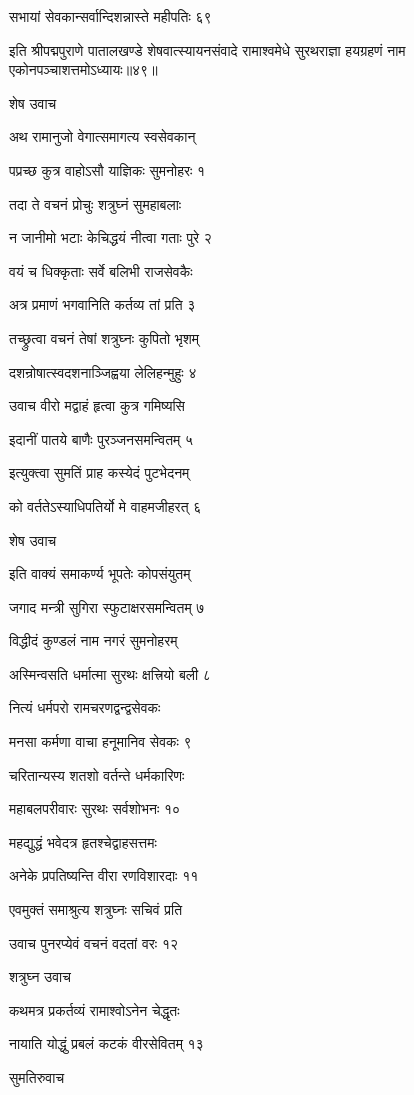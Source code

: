 सभायां सेवकान्सर्वान्दिशन्नास्ते महीपतिः ६९

इति श्रीपद्मपुराणे पातालखण्डे शेषवात्स्यायनसंवादे रामाश्वमेधे सुरथराज्ञा हयग्रहणं नाम एकोनपञ्चाशत्तमोऽध्यायः॥४९॥


शेष उवाच

अथ रामानुजो वेगात्समागत्य स्वसेवकान्

पप्रच्छ कुत्र वाहोऽसौ याज्ञिकः सुमनोहरः १

तदा ते वचनं प्रोचुः शत्रुघ्नं सुमहाबलाः

न जानीमो भटाः केचिद्धयं नीत्वा गताः पुरे २

वयं च धिक्कृताः सर्वे बलिभी राजसेवकैः

अत्र प्रमाणं भगवानिति कर्तव्य तां प्रति ३

तच्छ्रुत्वा वचनं तेषां शत्रुघ्नः कुपितो भृशम्

दशन्रोषात्स्वदशनाञ्जिह्वया लेलिहन्मुहुः ४

उवाच वीरो मद्वाहं हृत्वा कुत्र गमिष्यसि

इदानीं पातये बाणैः पुरञ्जनसमन्वितम् ५

इत्युक्त्वा सुमतिं प्राह कस्येदं पुटभेदनम्

को वर्ततेऽस्याधिपतिर्यो मे वाहमजीहरत् ६

शेष उवाच

इति वाक्यं समाकर्ण्य भूपतेः कोपसंयुतम्

जगाद मन्त्री सुगिरा स्फुटाक्षरसमन्वितम् ७

विद्धीदं कुण्डलं नाम नगरं सुमनोहरम्

अस्मिन्वसति धर्मात्मा सुरथः क्षत्त्रियो बली ८

नित्यं धर्मपरो रामचरणद्वन्द्वसेवकः

मनसा कर्मणा वाचा हनूमानिव सेवकः ९

चरितान्यस्य शतशो वर्तन्ते धर्मकारिणः

महाबलपरीवारः सुरथः सर्वशोभनः १०

महद्युद्धं भवेदत्र हृतश्चेद्वाहसत्तमः

अनेके प्रपतिष्यन्ति वीरा रणविशारदाः ११

एवमुक्तं समाश्रुत्य शत्रुघ्नः सचिवं प्रति

उवाच पुनरप्येवं वचनं वदतां वरः १२

शत्रुघ्न उवाच

कथमत्र प्रकर्तव्यं रामाश्वोऽनेन चेद्धृतः

नायाति योद्धुं प्रबलं कटकं वीरसेवितम् १३

सुमतिरुवाच

